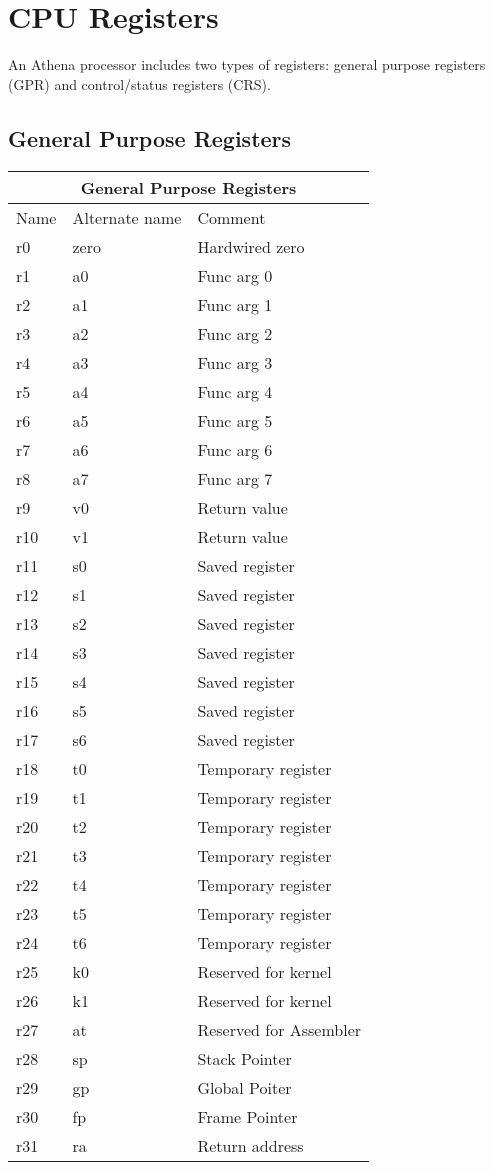 \section{CPU Registers}

An Athena processor includes two types of registers: general purpose registers (GPR) and control/status registers (CRS). 

\subsection{General Purpose Registers}

\begin{tabular}{ |p{3cm}|p{3cm}|p{4cm}|  }
    \hline
    \multicolumn{3}{|c|}{General Purpose Registers} \\
    \hline
    Name& Alternate name & Comment \\
    \hline
    r0  & zero & Hardwired zero\\
    r1  & a0   & Func arg 0 \\
    r2  & a1   & Func arg 1 \\
    r3  & a2   & Func arg 2 \\
    r4  & a3   & Func arg 3 \\
    r5  & a4   & Func arg 4 \\
    r6  & a5   & Func arg 5 \\
    r7  & a6   & Func arg 6 \\
    r8  & a7   & Func arg 7 \\
    r9  & v0   & Return value \\
    r10 & v1   & Return value \\
    r11 & s0   & Saved register \\
    r12 & s1   & Saved register  \\
    r13 & s2   & Saved register  \\
    r14 & s3   & Saved register  \\
    r15 & s4   & Saved register  \\
    r16 & s5   & Saved register  \\
    r17 & s6   & Saved register  \\
    r18 & t0   & Temporary register \\
    r19 & t1   & Temporary register \\
    r20 & t2   & Temporary register \\
    r21 & t3   & Temporary register \\
    r22 & t4   & Temporary register \\
    r23 & t5   & Temporary register \\
    r24 & t6   & Temporary register\\
    r25 & k0   & Reserved for kernel \\
    r26 & k1   & Reserved for kernel \\
    r27 & at   & Reserved for Assembler \\
    r28 & sp   & Stack Pointer \\
    r29 & gp   & Global Poiter \\
    r30 & fp   & Frame Pointer \\
    r31 & ra   & Return address \\
    

\end{tabular}
